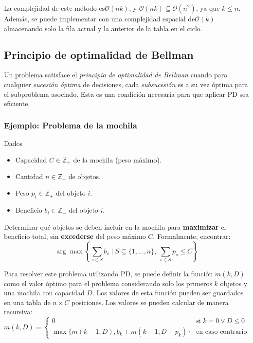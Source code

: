 \documentclass[a4paper]{report}
\newcommand{\BigO}[1]{\ensuremath{\mathcal{O}(#1)}}
\newcommand{\si}{\text{si }}
\newcommand{\ecc}{\text{en caso contrario}}
\newcommand{\Z}{\mathbb{Z}}
\begin{document}
La complejidad de este método es\BigO{nk}, y $\BigO{nk} \subseteq \BigO{n^2}$, ya que $k \leq n$. Además, se puede implementar con una complejidad espacial de\BigO{k} almacenando solo la fila actual y la anterior de la tabla en el ciclo.

\subsection{Principio de optimalidad de Bellman}

Un problema satisface el \textit{principio de optimalidad de Bellman} cuando para cualquier \textit{sucesión óptima} de decisiones, cada \textit{subsucesión} es a su vez óptima para el subproblema asociado. Esta es una condición necesaria para que aplicar PD sea eficiente.

\subsubsection{Ejemplo: Problema de la mochila}
\label{problema-mochila}

\begin{problema}
    Dados
    \begin{itemize}
        \item Capacidad $C \in \Z_+$ de la mochila (peso máximo).
        \item Cantidad $n \in \Z_+$ de objetos.
        \item Peso $p_i \in \Z_+$ del objeto $i$.
        \item Beneficio $b_i \in \Z_+$ del objeto $i$.
    \end{itemize}

    Determinar qué objetos se deben incluir en la mochila para \textbf{maximizar} el beneficio total, sin \textbf{excederse} del peso máximo $C$. Formalmente, encontrar:
    $$\arg\max{\left\{\sum_{s \in S} b_s \mid S \subseteq \{1, ..., n\},\ \sum_{s \in S} p_s \leq C \right\}}$$
\end{problema}

Para resolver este problema utilizando PD, se puede definir la función $m(k, D)$ como el valor óptimo para el problema considerando solo los primeros $k$ objetos y una mochila con capacidad $D$. Los valores de esta función pueden ser guardados en una tabla de $n \times C$ posiciones. Los valores se pueden calcular de manera recursiva:
$$
    m(k, D) =
    \begin{cases}
        0                                              & \si k = 0 \lor D \leq 0 \\
        \max{\{m(k - 1, D), b_k + m(k - 1, D - p_k)\}} & \ecc
    \end{cases}
$$
\end{document}
